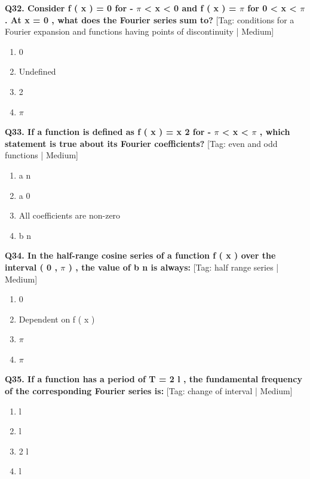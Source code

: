\noindent\textbf{Q32. Consider f ( x ) = 0 for - $\pi$ < x < 0 and f ( x ) = $\pi$ for 0 < x < $\pi$ . At x = 0 , what does the Fourier series sum to?} \hfill [Tag: conditions for a Fourier expansion and functions having points of discontinuity | Medium]
\begin{enumerate}[label=(\alph*),topsep=2pt,itemsep=1pt,partopsep=0pt,parsep=0pt]
    \item {{0}}
    \item {{Undefined}}
    \item {{2}}
    \item {{$\pi$}}
\end{enumerate}
\vspace{2mm}

\noindent\textbf{Q33. If a function is defined as f ( x ) = x 2 for - $\pi$ < x < $\pi$ , which statement is true about its Fourier coefficients?} \hfill [Tag: even and odd functions | Medium]
\begin{enumerate}[label=(\alph*),topsep=2pt,itemsep=1pt,partopsep=0pt,parsep=0pt]
    \item {{a n}}
    \item {{a 0}}
    \item {{All coefficients are non-zero}}
    \item {{b n}}
\end{enumerate}
\vspace{2mm}

\noindent\textbf{Q34. In the half-range cosine series of a function f ( x ) over the interval ( 0 , $\pi$ ) , the value of b n is always:} \hfill [Tag: half range series | Medium]
\begin{enumerate}[label=(\alph*),topsep=2pt,itemsep=1pt,partopsep=0pt,parsep=0pt]
    \item {{0}}
    \item {{Dependent on f ( x )}}
    \item {{$\pi$}}
    \item {{$\pi$}}
\end{enumerate}
\vspace{2mm}

\noindent\textbf{Q35. If a function has a period of T = 2 l , the fundamental frequency of the corresponding Fourier series is:} \hfill [Tag: change of interval | Medium]
\begin{enumerate}[label=(\alph*),topsep=2pt,itemsep=1pt,partopsep=0pt,parsep=0pt]
    \item {{l}}
    \item {{l}}
    \item {{2 l}}
    \item {{l}}
\end{enumerate}
\vspace{2mm}

